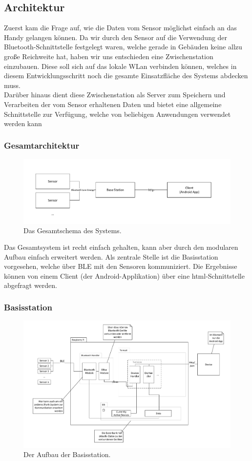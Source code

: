 \subsection{Architektur}
Zuerst kam die Frage auf, wie die Daten vom Sensor möglichst einfach an das Handy gelangen können. Da wir durch den Sensor auf die Verwendung der Bluetooth-Schnittstelle festgelegt waren, welche gerade in Gebäuden keine allzu große Reichweite hat, haben wir uns entschieden eine Zwischenstation einzubauen. Diese soll sich auf das lokale WLan verbinden können, welches in diesem Entwicklungsschritt noch die gesamte Einsatzfläche des Systems abdecken muss. \\
Darüber hinaus dient diese Zwischenstation als Server zum Speichern und Verarbeiten der vom Sensor erhaltenen Daten und bietet eine allgemeine Schnittstelle zur Verfügung, welche von beliebigen Anwendungen verwendet werden kann
\subsubsection{Gesamtarchitektur}
\begin{figure}[htb] 
	\centerline{\includegraphics[scale=.5]{Architektur/dryR_complete.pdf}}
	\caption{Das Gesamtschema des Systems.}
\end{figure}

Das Gesamtsystem ist recht einfach gehalten, kann aber durch den modularen Aufbau einfach erweitert werden. Als zentrale Stelle ist die Basisstation vorgesehen, welche über BLE mit den Sensoren kommuniziert. Die Ergebnisse können von einem Client (der Android-Applikation) über eine html-Schnittstelle abgefragt werden.
\subsubsection{Basisstation}
\begin{figure}[htb] 
	\centerline{\includegraphics[scale=.4]{Architektur/BaseStation_v2.pdf} }
	\caption{Der Aufbau der Basisstation.}
\end{figure}

